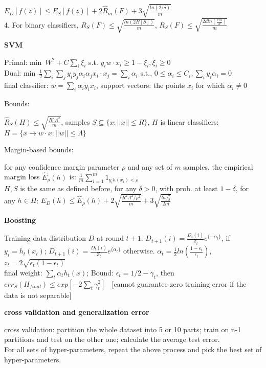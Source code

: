 \documentclass{article}
\begin{document}
 $E_D[f(z)] \leq E_S[f(z)] + 2\hat{R}_m(F) + 3\sqrt{\frac{ln(2/\delta)}{m}}$ \\
 4. For binary classifiers, $R_S(F) \leq \sqrt{\frac{ln(2H[S])}{m}}$, 
 $R_S(F) \leq \sqrt{\frac{2dln(\frac{em}{d})}{m}}$
 
 \noindent
 \textbf{SVM}
 
 Primal: min~$W^2+C\sum_i \xi_i$ s.t. $y_iw\cdot x_i \geq 1-\xi_i, \xi_i \geq 0$ \\
 Dual: min~$\frac{1}{2}\sum_i\sum_j y_i y_j \alpha_i \alpha_j x_i \cdot x_j = \sum_i \alpha_i$ s.t., $0 \leq \alpha_i \leq C_i, \sum_i y_i \alpha_i =0$ \\
 final classifier: $w=\sum_i \alpha_i y_i x_i$, support vectors: the points $x_i$ for which $\alpha_i \neq 0$
 
 Bounds:
 
 $\hat{R}_S(H) \leq \sqrt{\frac{R^2\Lambda^2}{m}}$, samples $S \subseteq \{x: ||x|| \leq R\}$, $H$ is linear classifiers: $H=\{x \rightarrow w \cdot x: ||w|| \leq \Lambda\}$
 
 Margin-based bounds:
 
 for any confidence margin parameter $\rho$ and any set of $m$ samples, the empirical margin loss $\hat{E}_{\rho}(h)$ is: $\frac{1}{m}\sum_{i=1}^m 1_{y_i h(x_i) < \rho}$ \\
 $H, S$ is the same as defined before, for any $\delta > 0$, with prob. at least $1-\delta$, for any $h \in H$: $E_D(h) \leq \hat{E}_{\rho}(h) + 2 \sqrt{\frac{R^2\Lambda^2 / \rho^2}{m}} + 3 \sqrt{\frac{log \frac{2}{\delta}}{2m}}$
 
 
 \noindent
 \textbf{Boosting}
 
Training data distribution $D$ at round $t+1$: $D_{t+1}(i) = \frac{D_t(i)}{Z_t}e^{\{-\alpha_t\}}$, if $y_i = h_t(x_i)$;  $D_{t+1}(i) = \frac{D_t(i)}{Z_t}e^{\{\alpha_t\}}$ otherwise. $\alpha_t=\frac{1}{2} ln(\frac{1-\epsilon_t}{\epsilon_t})$, $z_t = 2\sqrt{\epsilon_t(1-\epsilon_t)}$ \\
final weight: $\sum_t \alpha_t h_t(x)$; Bound: $\epsilon_t = 1/2-\gamma_t$, then $err_S(H_{final}) \leq exp[-2 \sum_t \gamma_t ^2]$~ [cannot guarantee zero training error if the data is not separable]

\noindent
\textbf{cross validation and generalization error}

cross validation: partition the whole dataset into 5 or 10 parts; train on n-1 partitions and test on the other one; calculate the average test error.  \\
For all sets of hyper-parameters, repeat the above process and pick the best set of hyper-parameters.
\end{document}
